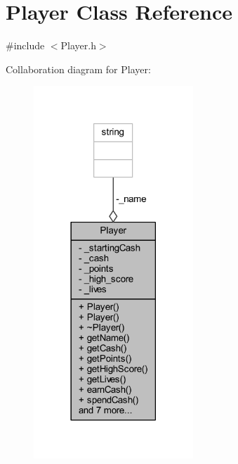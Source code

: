 \hypertarget{class_player}{\section{Player Class Reference}
\label{class_player}
}


{\ttfamily \#include $<$Player.\+h$>$}



Collaboration diagram for Player\+:
\nopagebreak
\begin{figure}[H]
\begin{center}
\leavevmode
\includegraphics[width=170pt]{class_player__coll__graph}
\end{center}
\end{figure}
